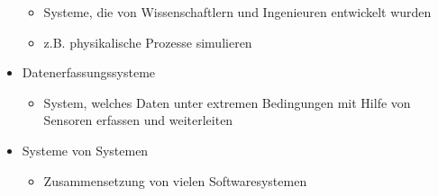 \begin{itemize}
\begin{itemize}
        \item Systeme, die von Wissenschaftlern und Ingenieuren entwickelt wurden
        \item z.B. physikalische Prozesse simulieren
    \end{itemize}
    \item Datenerfassungssysteme
    \begin{itemize}
        \item System, welches Daten unter extremen Bedingungen mit Hilfe von Sensoren erfassen und weiterleiten
    \end{itemize}
    \item Systeme von Systemen
    \begin{itemize}
        \item Zusammensetzung von vielen Softwaresystemen
    \end{itemize}
\end{itemize}

